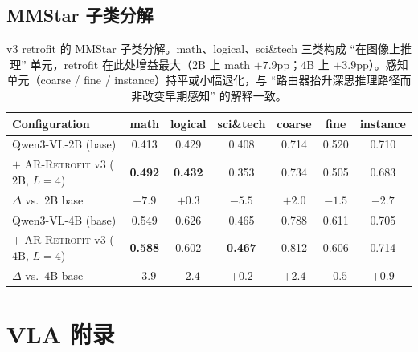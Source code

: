 \documentclass{article}
\newcommand{\retrofit}{\textsc{AR-Retrofit}}
\begin{document}
\subsection{MMStar 子类分解}
\label{app:mmstar_subcat}
\begin{table}[h]
\caption{v3 retrofit 的 MMStar 子类分解。math、logical、sci\&tech 三类构成 ``在图像上推理'' 单元，retrofit 在此处增益最大（$2$B 上 math $+7.9$pp；$4$B 上 $+3.9$pp）。感知单元（coarse / fine / instance）持平或小幅退化，与 ``路由器抬升深思推理路径而非改变早期感知'' 的解释一致。}
\label{tab:mmstar_subcat}
\centering\small
\setlength{\tabcolsep}{4pt}
\begin{tabular}{lcccccc}
\toprule
Configuration & math & logical & sci\&tech & coarse & fine & instance \\
\midrule
Qwen3-VL-2B (base)                       & 0.413 & 0.429 & 0.408 & 0.714 & 0.520 & 0.710 \\
$+$ \retrofit{} v3 ($2$B, $L{=}4$)       & \textbf{0.492} & \textbf{0.432} & 0.353 & 0.734 & 0.505 & 0.683 \\
$\Delta$ vs.\ $2$B base                   & $\mathbf{+7.9}$ & $+0.3$ & $-5.5$ & $+2.0$ & $-1.5$ & $-2.7$ \\
\midrule
Qwen3-VL-4B (base)                       & 0.549 & 0.626 & 0.465 & 0.788 & 0.611 & 0.705 \\
$+$ \retrofit{} v3 ($4$B, $L{=}4$)       & \textbf{0.588} & 0.602 & \textbf{0.467} & 0.812 & 0.606 & 0.714 \\
$\Delta$ vs.\ $4$B base                   & $\mathbf{+3.9}$ & $-2.4$ & $+0.2$ & $+2.4$ & $-0.5$ & $+0.9$ \\
\bottomrule
\end{tabular}
\end{table}

\section{VLA 附录}
\label{app:vla_section}
\end{document}
